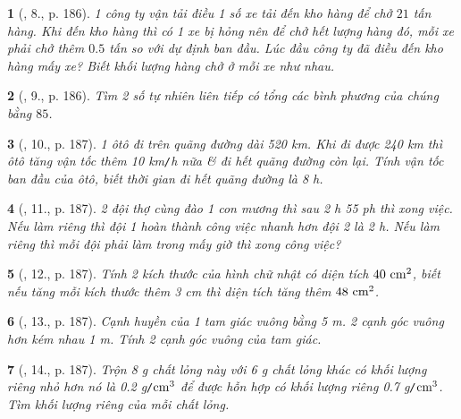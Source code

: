 \documentclass{article}
\newtheorem{baitoan}{}
\begin{document}
\begin{baitoan}[\cite{Thu_Viet_Minh_ptb2}, 8., p. 186]
	1 công ty vận tải điều 1 số xe tải đến kho hàng để chở $21$ tấn hàng. Khi đến kho hàng thì có 1 xe bị hỏng nên để chở hết lượng hàng đó, mỗi xe phải chở thêm $0.5$ tấn so với dự định ban đầu. Lúc đầu công ty đã điều đến kho hàng mấy xe? Biết khối lượng hàng chở ở mỗi xe như nhau.
\end{baitoan}

\begin{baitoan}[\cite{Thu_Viet_Minh_ptb2}, 9., p. 186]
	Tìm 2 số tự nhiên liên tiếp có tổng các bình phương của chúng bằng $85$.
\end{baitoan}

\begin{baitoan}[\cite{Thu_Viet_Minh_ptb2}, 10., p. 187]
	1 ôtô đi trên quãng đường dài {\rm520 km}. Khi đi được {\rm240 km} thì ôtô tăng vận tốc thêm {\rm10 km{\tt/}h} nữa \& đi hết quãng đường còn lại. Tính vận tốc ban đầu của ôtô, biết thời gian đi hết quãng đường là {\rm8 h}.
\end{baitoan}

\begin{baitoan}[\cite{Thu_Viet_Minh_ptb2}, 11., p. 187]
	2 đội thợ cùng đào 1 con mương thì sau {\rm2 h 55 ph} thì xong việc. Nếu làm riêng thì đội 1 hoàn thành công việc nhanh hơn đội 2 là {\rm2 h}. Nếu làm riêng thì mỗi đội phải làm trong mấy giờ thì xong công việc?
\end{baitoan}

\begin{baitoan}[\cite{Thu_Viet_Minh_ptb2}, 12., p. 187]
	Tính 2 kích thước của hình chữ nhật có diện tích $\rm40\ cm^2$, biết nếu tăng mỗi kích thước thêm {\rm3 cm} thì diện tích tăng thêm $\rm48\ cm^2$.
\end{baitoan}

\begin{baitoan}[\cite{Thu_Viet_Minh_ptb2}, 13., p. 187]
	Cạnh huyền của 1 tam giác vuông bằng {\rm5 m}. 2 cạnh góc vuông hơn kém nhau {\rm1 m}. Tính 2 cạnh góc vuông của tam giác.
\end{baitoan}

\begin{baitoan}[\cite{Thu_Viet_Minh_ptb2}, 14., p. 187]
	Trộn {\rm8 g} chất lỏng này với {\rm6 g} chất lỏng khác có khối lượng riêng nhỏ hơn nó là {\rm0.2 g{\tt/}$\rm cm^3$} để được hỗn hợp có khối lượng riêng {\rm0.7 g{\tt/}$\rm cm^3$}. Tìm khối lượng riêng của mỗi chất lỏng.
\end{baitoan}
\end{document}
